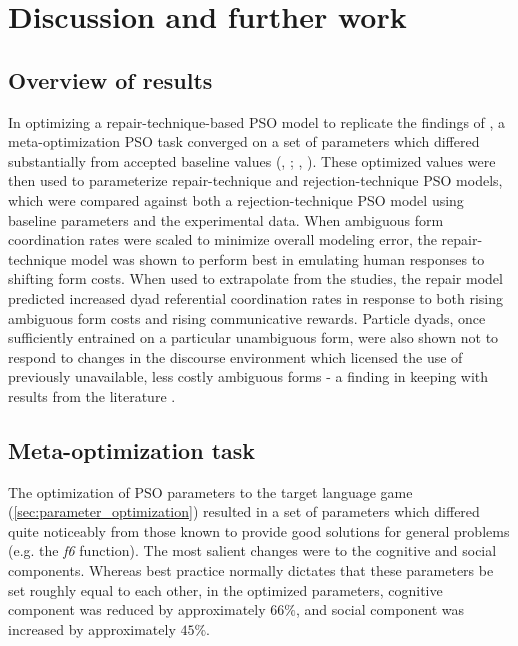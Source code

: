\documentclass[12pt,a4paper]{article}
\begin{document}
\section{Discussion and further work}
\subsection{Overview of results}
In optimizing a repair-technique-based PSO model to replicate the findings of \citeauthor{rohde2012}, a meta-optimization PSO task converged on a set of parameters which differed substantially from accepted baseline values (\citeauthor{shi1998}, \citeyear{shi1998}; \citeauthor{solnon2010}, \citeyear{solnon2010}). These optimized values were then used to parameterize repair-technique and rejection-technique PSO models, which were compared against both a rejection-technique PSO model using baseline parameters and the experimental data. When ambiguous form coordination rates were scaled to minimize overall modeling error, the repair-technique model was shown to perform best in emulating human responses to shifting form costs. When used to extrapolate from the \citeauthor{rohde2012} studies, the repair model predicted increased dyad referential coordination rates in response to both rising ambiguous form costs and rising communicative rewards. Particle dyads, once sufficiently entrained on a particular unambiguous form, were also shown not to respond to changes in the discourse environment which licensed the use of previously unavailable, less costly ambiguous forms - a finding in keeping with results from the literature \citep{brennan1996}.

\subsection{Meta-optimization task}
The optimization of PSO parameters to the target language game (\ref{sec:parameter_optimization}) resulted in a set of parameters which differed quite noticeably from those known to provide good solutions for general problems (e.g. the \textit{f6} function). The most salient changes were to the cognitive and social components. Whereas best practice normally dictates that these parameters be set roughly equal to each other, in the optimized parameters, cognitive component was reduced by approximately $66\%$, and social component was increased by approximately $45\%$. 
\end{document}

